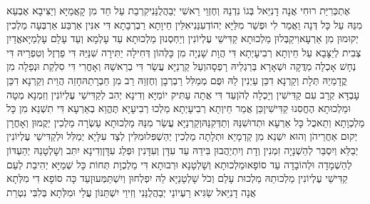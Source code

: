 \documentclass[../main/main.tex]{subfiles}
\begin{document}
\begin{multicols*}{\ncols}
אֶתְכְּרִיַּת רוּחִי אֲנָה דָנִיֵּאל בְּגוֹ נִדְנֵהּ\SubEnd{} וְחֶזְוֵי רֵאשִׁי יְבַהֲלֻנַּנִי\PreVerseSpace{}קִרְבֵת עַל חַד מִן קָאֲמַיָּא וְיַצִּיבָא אֶבְעֵא מִנֵּהּ עַל כָּל דְּנָה וַאֲמַר לִי וּפְשַׁר מִלַּיָּא יְהוֹדְעִנַּנִי\PreVerseSpace{}אִלֵּין חֵיוָתָא רַבְרְבָתָא דִּי אִנִּין אַרְבַּע אַרְבְּעָה מַלְכִין יְקוּמוּן מִן אַרְעָא\PreVerseSpace{}וִיקַבְּלוּן מַלְכוּתָא קַדִּישֵׁי עֶלְיוֹנִין וְיַחְסְנוּן מַלְכוּתָא עַד עָלְמָא וְעַד עָלַם עָלְמַיָּא\PreVerseSpace{}אֱדַיִן צְבִית לְיַצָּבָא עַל חֵיוְתָא רְבִיעָיְתָא דִּי הֲוָת שָׁנְיָה מִן כָּלְּהוֹן דְּחִילָה יַתִּירָה שִׁנַּיַּהּ דִּי פַרְזֶל וְטִפְרַיהּ דִּי נְחָשׁ אָכְלָה מַדֲּקָה וּשְׁאָרָא בְּרַגְלַיהּ רָפְסָה\PreVerseSpace{}וְעַל קַרְנַיָּא עֲשַׂר דִּי בְרֵאשַׁהּ וְאָחֳרִי דִּי סִלְקַת וּנְפַלָה\SubEnd{} מִן קֳדָמַיַהּ תְּלָת וְקַרְנָא דִכֵּן עַיְנִין\SubEnd{} לַהּ וּפֻם מְמַלִּל רַבְרְבָן וְחֶזְוַהּ רַב מִן חַבְרָתַהּ\PreVerseSpace{}חָזֵה הֲוֵית וְקַרְנָא דִכֵּן עָבְדָּא קְרָב עִם קַדִּישִׁין וְיָכְלָה לְהֹן\PreVerseSpace{}עַד דִּי אֲתָה עַתִּיק יוֹמַיָּא וְדִינָא יְהִב לְקַדִּישֵׁי עֶלְיוֹנִין וְזִמְנָא מְטָה וּמַלְכוּתָא הֶחֱסִנוּ קַדִּישִׁין\PreVerseSpace{}כֵּן אֲמַר חֵיוְתָא רְבִיעָיְתָא מַלְכוּ רְבִיעָיָא תֶּהֱוֵא בְאַרְעָא דִּי תִשְׁנֵא מִן כָּל מַלְכְוָתָא וְתֵאכֻל כָּל אַרְעָא וּתְדוּשִׁנַּהּ וְתַדְּקִנַּהּ\PreVerseSpace{}וְקַרְנַיָּא עֲשַׂר מִנַּהּ מַלְכוּתָא עַשְׂרָה מַלְכִין יְקֻמוּן וְאָחֳרָן יְקוּם אַחֲרֵיהֹן וְהוּא יִשְׁנֵא מִן קַדְמָיֵא וּתְלָתָה מַלְכִין יְהַשְׁפִּל\PreVerseSpace{}וּמִלִּין לְצַד עִלָּיָא יְמַלִּל וּלְקַדִּישֵׁי עֶלְיוֹנִין יְבַלֵּא וְיִסְבַּר לְהַשְׁנָיָה זִמְנִין וְדָת וְיִתְיַהֲבוּן בִּידֵהּ עַד עִדָּן וְעִדָּנִין וּפְלַג עִדָּן\PreVerseSpace{}וְדִינָא יִתִּב וְשָׁלְטָנֵהּ יְהַעְדּוֹן לְהַשְׁמָדָה וּלְהוֹבָדָה עַד סוֹפָא\PreVerseSpace{}וּמַלְכוּתָא וְשָׁלְטָנָא וּרְבוּתָא דִּי מַלְכְוָת תְּחוֹת כָּל שְׁמַיָּא יְהִיבַת לְעַם קַדִּישֵׁי עֶלְיוֹנִין מַלְכוּתֵהּ מַלְכוּת עָלַם וְכֹל שָׁלְטָנַיָּא לֵהּ יִפְלְחוּן וְיִשְׁתַּמְּעוּן\PreVerseSpace{}עַד כָּה סוֹפָא דִי מִלְּתָא אֲנָה דָנִיֵּאל שַׂגִּיא רַעְיוֹנַי יְבַהֲלֻנַּנִי וְזִיוַי יִשְׁתַּנּוֹן עֲלַי וּמִלְּתָא בְּלִבִּי נִטְרֵת\OpenSection{}\par

\end{multicols*}
\end{document}

